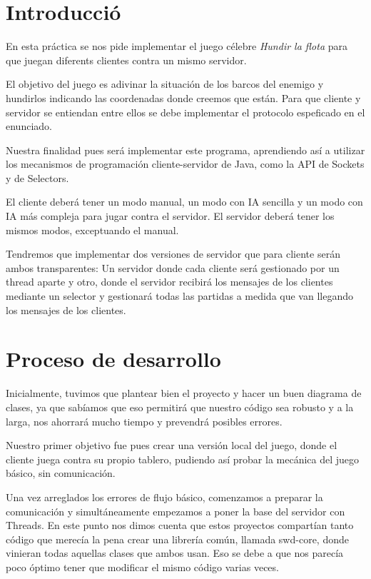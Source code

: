 \section*{Introducció}
En esta práctica se nos pide implementar el juego célebre \textit{Hundir la flota} para que juegan diferents clientes contra un mismo servidor.

El objetivo del juego es adivinar la situación de los barcos del enemigo y hundirlos indicando las coordenadas donde creemos que están. Para que cliente y servidor se entiendan entre ellos se debe implementar el protocolo espeficado en el enunciado.

Nuestra finalidad pues será implementar este programa, aprendiendo así a utilizar los mecanismos de programación cliente-servidor de Java, como la API de Sockets y de Selectors.

El cliente deberá tener un modo manual, un modo con IA sencilla y un modo con IA más compleja para jugar contra el servidor. El servidor deberá tener los mismos modos, exceptuando el manual.

Tendremos que implementar dos versiones de servidor que para cliente serán ambos transparentes: Un servidor donde cada cliente será gestionado por un thread aparte y otro, donde el servidor recibirá los mensajes de los clientes mediante un selector y gestionará todas las partidas a medida que van llegando los mensajes de los clientes.

\newpage
\section*{Proceso de desarrollo}
Inicialmente, tuvimos que plantear bien el proyecto y hacer un buen diagrama de clases, ya que sabíamos que eso permitirá que nuestro código sea robusto  y a la larga, nos ahorrará mucho tiempo y prevendrá posibles errores.

Nuestro primer objetivo fue pues crear una versión local del juego, donde el cliente juega contra su propio tablero, pudiendo así probar la mecánica del juego básico, sin comunicación.

Una vez arreglados los errores de flujo básico, comenzamos a preparar la comunicación y simultáneamente empezamos a poner la base del servidor con Threads. En este punto nos dimos cuenta que estos proyectos compartían tanto código que merecía la pena crear una librería común, llamada swd-core,  donde vinieran todas aquellas clases que ambos usan. Eso se debe a que nos parecía poco óptimo tener que modificar el mismo código varias veces.

